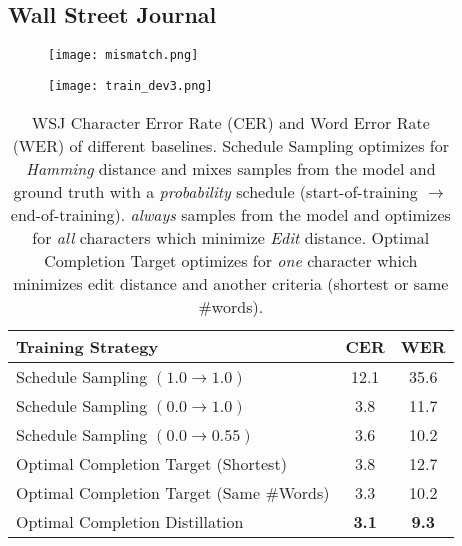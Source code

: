 \subsection{Wall Street Journal}
\begin{figure}[t]
\begin{minipage}{.48\textwidth}
\centering
  \texttt{[image: mismatch.png]}
  \vspace*{.3cm}
  \label{fig:frac}
\end{minipage}
\hspace{.4cm}
\begin{minipage}{.48\textwidth}
\centering
  \texttt{[image: train\_dev3.png]}
  \vspace*{.3cm}
  \label{fig:gen}
\end{minipage}%
\end{figure} 
\begin{table}
\centering
\caption{WSJ Character Error Rate (CER) and Word Error Rate (WER) of different baselines. Schedule Sampling optimizes for \textit{Hamming} distance and mixes samples from the model and ground truth with a \textit{probability} schedule (start-of-training $\rightarrow$ end-of-training). \acronym \textit{always} samples from the model and optimizes for \textit{all} characters which minimize \textit{Edit} distance. Optimal Completion Target optimizes for \textit{one} character which minimizes edit distance and another criteria (shortest or same \#words). }%
\label{tab:comparison}
\begin{tabular}{lcc} 
 \toprule
 \textbf{Training Strategy} & \textbf{CER} & \textbf{WER} \\ 
 \midrule
 Schedule Sampling $(1.0 \rightarrow 1.0)$ & 12.1 & 35.6 \\
 Schedule Sampling $(0.0 \rightarrow 1.0)$ & 3.8 & 11.7 \\
 Schedule Sampling $(0.0 \rightarrow 0.55)$ & 3.6 & 10.2 \\
 \midrule
 Optimal Completion Target (Shortest) & 3.8 & 12.7\\
 Optimal Completion Target (Same \#Words) & 3.3 & 10.2\\
 \midrule
 Optimal Completion Distillation & \bf{3.1} & \bf{9.3} \\
 \bottomrule
\end{tabular}
\end{table}
